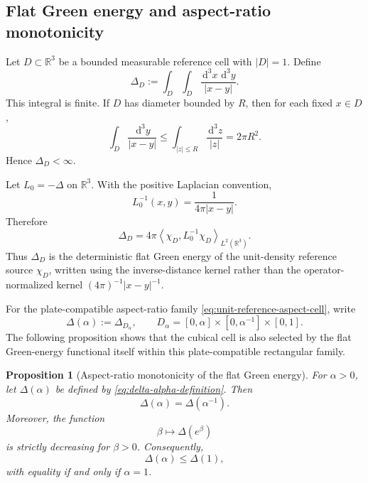 \documentclass[11pt]{article}
\newtheorem{proposition}[theorem]{Proposition}
\newcommand{\R}{\mathbb{R}}
\newcommand{\dd}{\,\mathrm{d}}
\newcommand{\braket}[2]{\left\langle #1,#2\right\rangle}
\begin{document}
\subsection{Flat Green energy and aspect-ratio monotonicity}
\label{sec:flat-green-aspect-monotonicity}

Let \(D\subset\R^3\) be a bounded measurable reference cell with
\(|D|=1\).  Define
\begin{equation}
    \Delta_D
    :=
    \int_D\int_D\frac{\dd^3x\,\dd^3y}{|x-y|}.
    \label{eq:reference-cell-delta}
\end{equation}
This integral is finite.  If \(D\) has diameter bounded by \(R\), then for
each fixed \(x\in D\),
\[
    \int_D\frac{\dd^3y}{|x-y|}
    \leq
    \int_{|z|\leq R}\frac{\dd^3z}{|z|}
    =
    2\pi R^2.
\]
Hence \(\Delta_D<\infty\).

Let \(L_0=-\Delta\) on \(\R^3\).  With the positive Laplacian convention,
\[
    L_0^{-1}(x,y)=\frac{1}{4\pi|x-y|}.
\]
Therefore
\begin{equation}
    \Delta_D
    =
    4\pi
    \braket{\chi_D}{L_0^{-1}\chi_D}_{L^2(\R^3)}.
    \label{eq:reference-cell-green}
\end{equation}
Thus \(\Delta_D\) is the deterministic flat Green energy of the
unit-density reference source \(\chi_D\), written using the inverse-distance
kernel rather than the operator-normalized kernel
\((4\pi)^{-1}|x-y|^{-1}\).

For the plate-compatible aspect-ratio family \eqref{eq:unit-reference-aspect-cell}, write
\begin{equation}
    \Delta(\alpha):=\Delta_{D_\alpha},
    \qquad
    D_\alpha=[0,\alpha]\times[0,\alpha^{-1}]\times[0,1].
    \label{eq:delta-alpha-definition}
\end{equation}
The following proposition shows that the cubical cell is also selected by the
flat Green-energy functional itself within this plate-compatible rectangular
family.

\begin{proposition}[Aspect-ratio monotonicity of the flat Green energy]
\label{prop:aspect-ratio-green-monotonicity}
For \(\alpha>0\), let \(\Delta(\alpha)\) be defined by
\eqref{eq:delta-alpha-definition}.  Then
\begin{equation}
    \Delta(\alpha)=\Delta(\alpha^{-1}).
    \label{eq:delta-alpha-symmetry}
\end{equation}
Moreover, the function
\[
    \beta\longmapsto \Delta(e^\beta)
\]
is strictly decreasing for \(\beta>0\).  Consequently,
\begin{equation}
    \Delta(\alpha)\leq \Delta(1),
    \label{eq:delta-alpha-cube-max}
\end{equation}
with equality if and only if \(\alpha=1\).
\end{proposition}
\end{document}
